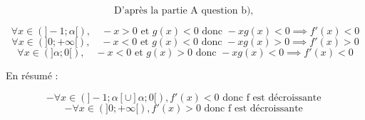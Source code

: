 \documentclass[12pt]{article}
\begin{document}
\begin{enumerate}
\begin{enumerate}
\[\text{D'après la partie A question b), }\]

\[ \forall x \in \left( ]-1;\alpha[\right),\quad -x>0 \text{ et } g(x)<0 \text{ donc } -xg(x)<0\implies f'(x)<0\]
\[ \forall x \in \left( ]0;+\infty[\right),\quad -x<0 \text{ et } g(x)<0 \text{ donc } -xg(x)>0\implies f'(x)>0\]
\[ \forall x \in \left( ]\alpha;0[\right),\quad -x<0 \text{ et } g(x)>0 \text{ donc } -xg(x)<0\implies f'(x)<0\]

En résumé :

\[- \forall x \in \left( ]-1;\alpha[\cup ]\alpha;0[ \right), f'(x)<0 \text{ donc f est décroissante }\]
\[- \forall x \in \left( ]0;+\infty[ \right)  , f'(x)>0 \text{ donc f est décroissante      }\]

\end{enumerate}
\end{enumerate}
\end{document}
